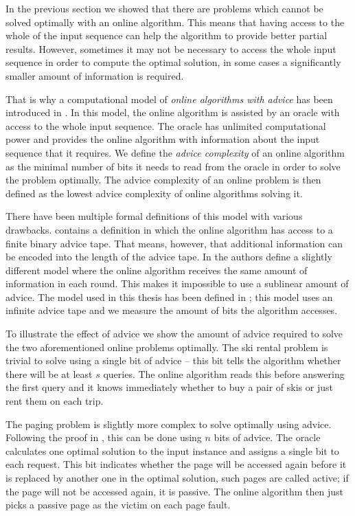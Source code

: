 In the previous section we showed that there are problems which cannot be
solved optimally with an online algorithm. This means that having access
to the whole of the input sequence can help the algorithm to provide
better partial results. However, sometimes it may not be necessary to
access the whole input sequence in order to compute the optimal solution,
in some cases a significantly smaller amount of information is required.

That is why a computational model of \emph{online algorithms with advice}
has been introduced in \cite{advice-first}. In this model, the online
algorithm is assisted by an oracle with access to the whole input
sequence. The oracle has unlimited computational power and provides the
online algorithm with information about the input sequence that it
requires. We define the \emph{advice complexity} of an online algorithm as
the minimal number of bits it needs to read from the oracle in order to
solve the problem optimally. The advice complexity of an online problem is
then defined as the lowest advice complexity of online algorithms solving
it.

There have been multiple formal definitions of this model with various
drawbacks. \cite{advice-first} contains a definition in which the online
algorithm has access to a finite binary advice tape. That means, however,
that additional information can be encoded into the length of the advice
tape. In \cite{advice-constant} the authors define a slightly different
model where the online algorithm receives the same amount of information
in each round. This makes it impossible to use a sublinear amount of
advice. The model used in this thesis has been defined in
\cite{advice-infinite}; this model uses an infinite advice tape and we
measure the amount of bits the algorithm accesses.

To illustrate the effect of advice we show the amount of advice required
to solve the two aforementioned online problems optimally. The ski rental
problem is trivial to solve using a single bit of advice -- this bit tells
the algorithm whether there will be at least $s$ queries. The online
algorithm reads this before answering the first query and it knows
immediately whether to buy a pair of skis or just rent them on each trip.

The paging problem is slightly more complex to solve optimally using
advice. Following the proof in \cite{paging-optimal}, this can be done
using $n$ bits of advice. The oracle calculates one optimal solution to
the input instance and assigns a single bit to each request. This bit
indicates whether the page will be accessed again before it is replaced by
another one in the optimal solution, such pages are called active; if the
page will not be accessed again, it is passive. The online algorithm then
just picks a passive page as the victim on each page fault.

